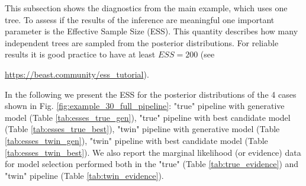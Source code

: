 This subsection shows the diagnostics from the main example, which
uses one tree.
To assess if the results of the inference are meaningful one important 
parameter is the Effective Sample Size (ESS). This quantity describes how 
many independent trees are sampled from the posterior distributions. 
For reliable results it is good practice to have at 
least $ESS = 200$ (see 
\begin{sloppypar}
  \url{https://beast.community/ess_tutorial}).
\end{sloppypar}
In the following we present the ESS for the posterior distributions of 
the 4 cases shown in Fig. \ref{fig:example_30_full_pipeline}: 
"true" pipeline with generative model (Table \ref{tab:esses_true_gen}), 
"true" pipeline with best candidate model (Table \ref{tab:esses_true_best}), 
"twin" pipeline with generative model (Table \ref{tab:esses_twin_gen}), 
"twin" pipeline with best candidate model (Table \ref{tab:esses_twin_best}). 
We also report the marginal likelihood (or evidence) data for model selection 
performed both in the "true" (Table \ref{tab:true_evidence}) and 
"twin" pipeline (Table \ref{tab:twin_evidence}).



